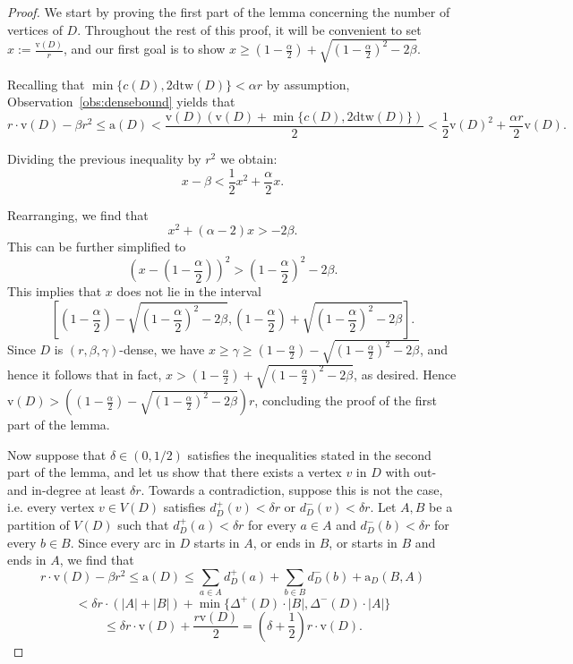 \documentclass[a4paper,10pt]{article}
\begin{document}
\begin{proof}
We start by proving the first part of the lemma concerning the number of vertices of $D$. Throughout the rest of this proof, it will be convenient to set $x:=\frac{\mathrm{v}(D)}{r}$, and our first goal is to show $x\ge \left(1-\frac{\alpha}{2}\right)+\sqrt{\left(1-\frac{\alpha}{2}\right)^2-2\beta}$. 

Recalling that $\min\{c(D),2\mathrm{dtw}(D)\}<\alpha r$ by assumption, Observation~\ref{obs:densebound} yields that
$$r\cdot \mathrm{v}(D)-\beta r^2\le \mathrm{a}(D)<\frac{\mathrm{v}(D)(\mathrm{v}(D)+\min\{c(D),2\mathrm{dtw}(D)\})}{2}<\frac{1}{2}\mathrm{v}(D)^2+\frac{\alpha r}{2}\mathrm{v}(D).$$

Dividing the previous inequality by $r^2$ we obtain:
$$x-\beta<\frac{1}{2}x^2+\frac{\alpha}{2}x.$$

Rearranging, we find that
$$x^2+(\alpha-2)x>-2\beta.$$
This can be further simplified to 
$$\left(x-\left(1-\frac{\alpha}{2}\right)\right)^2>\left(1-\frac{\alpha}{2}\right)^2-2\beta.$$ This implies that $x$ does not lie in the interval 
$$\left[\left(1-\frac{\alpha}{2}\right)-\sqrt{\left(1-\frac{\alpha}{2}\right)^2-2\beta},\left(1-\frac{\alpha}{2}\right)+\sqrt{\left(1-\frac{\alpha}{2}\right)^2-2\beta}\right].$$ Since $D$ is $(r,\beta,\gamma)$-dense, we have $x\ge \gamma\ge \left(1-\frac{\alpha}{2}\right)-\sqrt{\left(1-\frac{\alpha}{2}\right)^2-2\beta}$, and hence it follows that in fact, $x>\left(1-\frac{\alpha}{2}\right)+\sqrt{\left(1-\frac{\alpha}{2}\right)^2-2\beta}$, as desired. Hence $\mathrm{v}(D)>\left(\left(1-\frac{\alpha}{2}\right)-\sqrt{\left(1-\frac{\alpha}{2}\right)^2-2\beta}\right)r$, concluding the proof of the first part of the lemma.

Now suppose that $\delta\in (0,1/2)$ satisfies the inequalities stated in the second part of the lemma, and let us show that there exists a vertex $v$ in $D$ with out- and in-degree at least $\delta r$.
Towards a contradiction, suppose this is not the case, i.e. every vertex $v\in V(D)$ satisfies $d_D^+(v)<\delta r$ or $d_D^-(v)<\delta r$. Let $A, B$ be a partition of $V(D)$ such that $d_D^+(a)<\delta r$ for every $a\in A$ and $d_D^-(b)<\delta r$ for every $b\in B$. Since every arc in $D$ starts in $A$, or ends in $B$, or starts in $B$ and ends in $A$, we find that
$$r\cdot \mathrm{v}(D)-\beta r^2\le \mathrm{a}(D)\le \sum_{a\in A}d_D^+(a)+\sum_{b\in B}d_D^-(b)+\mathrm{a}_D(B,A)$$
$$<\delta r\cdot (|A|+|B|)+\min\{\Delta^+(D)\cdot |B|,\Delta^-(D)\cdot |A|\}$$
$$\le \delta r \cdot \mathrm{v}(D)+\frac{r\mathrm{v}(D)}{2}=\left(\delta+\frac{1}{2}\right)r\cdot \mathrm{v}(D).$$


\end{proof}
\end{document}
